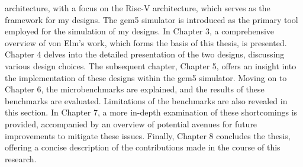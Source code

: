 architecture, with a focus on the Risc-V architecture, which serves as the
framework for my designs. The gem5 simulator is introduced as the primary tool
employed for the simulation of my designs. In Chapter 3, a comprehensive
overview of von Elm's work, which forms the basis of this thesis, is presented.
Chapter 4 delves into the detailed presentation of the two designs, discussing
various design choices. The subsequent chapter, Chapter 5, offers an insight
into the implementation of these designs within the gem5 simulator. Moving on to
Chapter 6, the microbenchmarks are explained, and the results of these
benchmarks are evaluated. Limitations of the benchmarks are also revealed in
this section. In Chapter 7, a more in-depth examination of these shortcomings is
provided, accompanied by an overview of potential avenues for future
improvements to mitigate these issues. Finally, Chapter 8 concludes the thesis,
offering a concise description of the contributions made in the course of this
research.